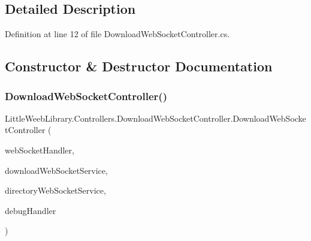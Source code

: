 \subsection{Detailed Description}


Definition at line 12 of file Download\+Web\+Socket\+Controller.\+cs.



\subsection{Constructor \& Destructor Documentation}
\mbox{\label{class_little_weeb_library_1_1_controllers_1_1_download_web_socket_controller_adb8f6706c45d35e72ffb9cca7e768605}} 
\subsubsection{\texorpdfstring{Download\+Web\+Socket\+Controller()}{DownloadWebSocketController()}}
{\footnotesize\ttfamily Little\+Weeb\+Library.\+Controllers.\+Download\+Web\+Socket\+Controller.\+Download\+Web\+Socket\+Controller (\begin{DoxyParamCaption}\item[{\mbox{\hyperlink{interface_little_weeb_library_1_1_handlers_1_1_i_web_socket_handler}{I\+Web\+Socket\+Handler}}}]{web\+Socket\+Handler,  }\item[{\mbox{\hyperlink{interface_little_weeb_library_1_1_services_1_1_i_download_web_socket_service}{I\+Download\+Web\+Socket\+Service}}}]{download\+Web\+Socket\+Service,  }\item[{\mbox{\hyperlink{interface_little_weeb_library_1_1_services_1_1_i_directory_web_socket_service}{I\+Directory\+Web\+Socket\+Service}}}]{directory\+Web\+Socket\+Service,  }\item[{\mbox{\hyperlink{interface_little_weeb_library_1_1_handlers_1_1_i_debug_handler}{I\+Debug\+Handler}}}]{debug\+Handler }\end{DoxyParamCaption})}



